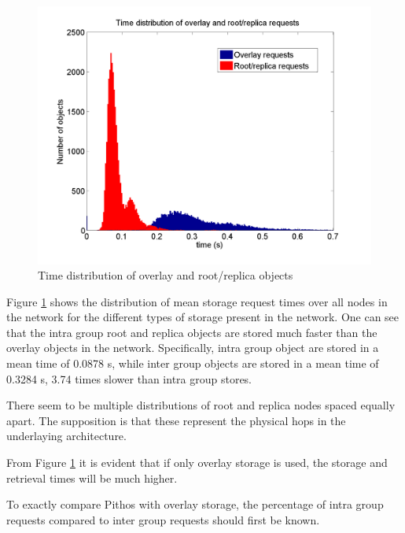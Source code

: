 \documentclass[10pt,a4paper,conference]{IEEEtran}
\begin{document}
\begin{figure}[htbp]
 \centering
 \includegraphics[clip=true, viewport=1.5cm 1.3cm 25.5cm 19.7cm, width=\columnwidth]{request_time_distribution}
 \caption{Time distribution of overlay and root/replica objects}
 \label{fig_pithos_response}
\end{figure}
%
Figure \ref{fig_pithos_response} shows the distribution of mean storage request times over all nodes in the network for the different types of
storage present in the network. One can see that the intra group root and replica objects are stored much faster than the overlay objects in the
network. Specifically, intra group object are stored in a mean time of 0.0878 s, while inter group objects are stored in a mean time of 0.3284 s,
3.74 times slower than intra group stores.

There seem to be multiple distributions of root and replica nodes spaced equally apart. The supposition is that these represent the physical hops in
the underlaying architecture.

From Figure \ref{fig_pithos_response} it is evident that if only overlay storage is used, the storage and retrieval times will be much higher.

To exactly compare Pithos with overlay storage, the percentage of intra group requests compared to inter group requests should first be known.
\end{document}
